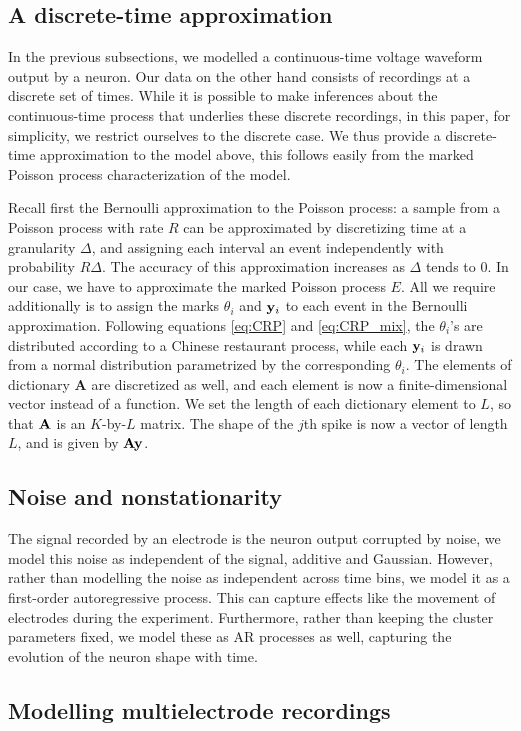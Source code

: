 \subsection{A discrete-time approximation}
In the previous subsections, we modelled a continuous-time voltage waveform output by a neuron. Our data on the other hand consists of recordings
at a discrete set of times. While it is possible to make inferences about the continuous-time process that underlies these discrete recordings,
in this paper, for simplicity, we restrict ourselves to the discrete case. We thus provide a discrete-time approximation to the model above, 
this follows easily from the marked Poisson process characterization of the model.

Recall first the Bernoulli approximation to the Poisson process: a sample from a Poisson process with rate $R$ can be approximated by discretizing
time at a granularity $\Delta$, and assigning each interval an event independently with probability $R\Delta$. The accuracy of this approximation increases 
as $\Delta$ tends to $0$.
%
In our case, we have to approximate the marked Poisson process $E$. All we require additionally is to assign the marks $\theta_i$ and $\mathbf{y}_i$ to each event 
in the Bernoulli approximation. Following equations \eqref{eq:CRP} and \eqref{eq:CRP_mix}, the $\theta_i$'s are distributed according
to a Chinese restaurant process, while each $\mathbf{y}_i$ is drawn from a normal distribution parametrized by the corresponding $\theta_i$. The elements
of dictionary $\mathbf{A}$ are discretized as well, and each element is now a finite-dimensional vector instead of a function. We set the length of each
dictionary element to $L$, so that $\mathbf{A}$ is an $K$-by-$L$ matrix. The shape of the $j$th spike is now a vector of length $L$, and is given by $\mathbf{A} \mathbf{y}$.

\subsection{Noise and nonstationarity}
The signal recorded by an electrode is the neuron output corrupted by noise, we model this noise as independent of the signal, additive and Gaussian.
However, rather than modelling the noise as independent across time bins, we model it as a first-order autoregressive process. This can capture
effects like the movement of electrodes during the experiment. Furthermore, rather than keeping the cluster parameters fixed, we model these as
AR processes as well, capturing the evolution of the neuron shape with time.

\subsection{Modelling multielectrode recordings}
